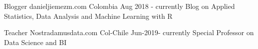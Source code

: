

\begin{cventries}

  \cventry
    {Blogger} %
    {danieljiemezm.com} %
    {Colombia} %
    {Aug 2018 - currently } %
    {Blog on Applied Statistics, Data Analysis and Machine Learning with R}
    
   \cventry
   {Teacher}
   {Nostradamusdata.com}
   {Col-Chile}
   {Jun-2019- currently }
   {Special Professor on Data Science and BI}

\end{cventries}
